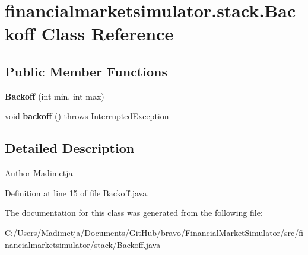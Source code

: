 \hypertarget{classfinancialmarketsimulator_1_1stack_1_1_backoff}{\section{financialmarketsimulator.\+stack.\+Backoff Class Reference}
\label{classfinancialmarketsimulator_1_1stack_1_1_backoff}
}
\subsection*{Public Member Functions}
\begin{DoxyCompactItemize}
\item 
\hypertarget{classfinancialmarketsimulator_1_1stack_1_1_backoff_ad23617770370498034c220b0c70ded4e}{{\bfseries Backoff} (int min, int max)}\label{classfinancialmarketsimulator_1_1stack_1_1_backoff_ad23617770370498034c220b0c70ded4e}

\item 
\hypertarget{classfinancialmarketsimulator_1_1stack_1_1_backoff_ac9fda467f801c8d4b07a77c49ef4d937}{void {\bfseries backoff} ()  throws Interrupted\+Exception }\label{classfinancialmarketsimulator_1_1stack_1_1_backoff_ac9fda467f801c8d4b07a77c49ef4d937}

\end{DoxyCompactItemize}


\subsection{Detailed Description}
\begin{DoxyAuthor}{Author}
Madimetja 
\end{DoxyAuthor}


Definition at line 15 of file Backoff.\+java.



The documentation for this class was generated from the following file\+:\begin{DoxyCompactItemize}
\item 
C\+:/\+Users/\+Madimetja/\+Documents/\+Git\+Hub/bravo/\+Financial\+Market\+Simulator/src/financialmarketsimulator/stack/Backoff.\+java\end{DoxyCompactItemize}
